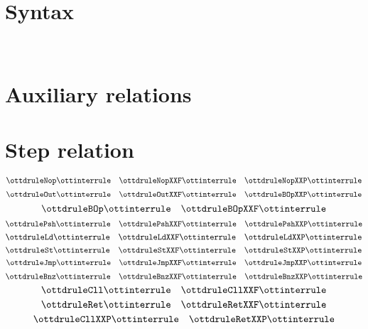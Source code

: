 \documentclass{article}
\begin{document}
\section*{Syntax}

\ottmetavars\\[3ex]

\ottgrammartabular{
\ottn\ottinterrule
\ottL\ottinterrule
\otta\ottinterrule
\ottinstr\ottinterrule
\ottS\ottinterrule
}

\section*{Auxiliary relations}

\ottgrammartabular{
\ottformula\ottinterrule
}

\pagebreak
\section*{Step relation}

\small

\[ \ottdruleNop \ottinterrule 
   \quad \ottdruleNopXXF \ottinterrule 
   \quad \ottdruleNopXXP \ottinterrule \]
\[ \ottdruleOut \ottinterrule
   \quad  \ottdruleOutXXF \ottinterrule 
   \quad \ottdruleBOpXXP \ottinterrule \]
\[ \ottdruleBOp \ottinterrule
   \quad \ottdruleBOpXXF \ottinterrule \]
\[ \ottdrulePsh \ottinterrule 
   \quad \ottdrulePshXXF \ottinterrule
   \quad \ottdrulePshXXP \ottinterrule \]
 \[ \ottdruleLd \ottinterrule 
   \quad \ottdruleLdXXF \ottinterrule
   \quad \ottdruleLdXXP \ottinterrule \]
\[ \ottdruleSt \ottinterrule
   \quad \ottdruleStXXF \ottinterrule
   \quad \ottdruleStXXP \ottinterrule \]
\[ \ottdruleJmp \ottinterrule
   \quad \ottdruleJmpXXF \ottinterrule 
   \quad \ottdruleJmpXXP \ottinterrule \]
\[ \ottdruleBnz \ottinterrule 
   \quad  \ottdruleBnzXXF \ottinterrule
   \quad  \ottdruleBnzXXP \ottinterrule  \] 
\[ \ottdruleCll \ottinterrule
   \quad  \ottdruleCllXXF \ottinterrule \]
\[ \ottdruleRet \ottinterrule   
   \quad  \ottdruleRetXXF \ottinterrule \]
\[ \ottdruleCllXXP \ottinterrule 
   \quad \ottdruleRetXXP \ottinterrule \] 

\end{document}
